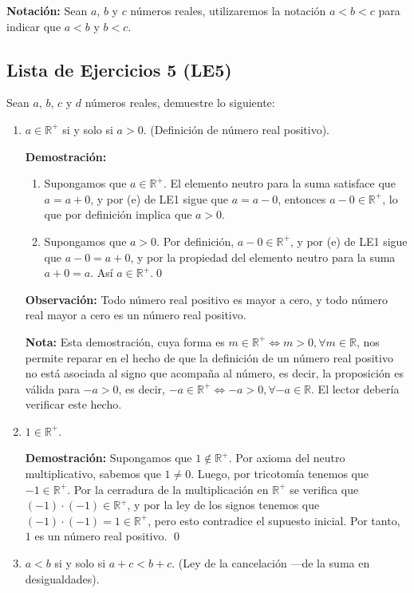\documentclass[11pt]{article}
\newcommand{\R}{\mathbb{R}}
\begin{document}
\textbf{Notación:} Sean $a$, $b$ y $c$ números reales, utilizaremos la notación $a<b<c$ para indicar que $a<b$ y $b<c$.

\subsection*{Lista de Ejercicios 5 (LE5)}

Sean $a$, $b$, $c$ y $d$ números reales, demuestre lo siguiente:
\begin{enumerate}[label=\alph*)]
    \item $a \in \R^+$ si y solo si $a>0$. (Definición de número real positivo).
    
    \textbf{Demostración:} \begin{enumerate}[label=\roman*)]
        \item Supongamos que $a \in \R^+$. El elemento neutro para la suma satisface que $a=a+0$, y por (e) de LE1 sigue que $a=a-0$, entonces $a-0 \in \R^+$, lo que por definición implica que $a>0$.
        \item Supongamos que $a>0$. Por definición, $a-0 \in \R^+$, y por (e) de LE1 sigue que $a-0=a+0$, y por la propiedad del elemento neutro para la suma $a+0=a$. Así $a \in \R^+$.\qed
    \end{enumerate}

    \textbf{Observación:} Todo número real positivo es mayor a cero, y todo número real mayor a cero es un número real positivo.
    
    \textbf{Nota:} Esta demostración, cuya forma es $m\in \R^+ \iff m>0, \forall m\in \R$, nos permite reparar en el hecho de que la definición de un número real positivo no está asociada al signo que acompaña al número, es decir, la proposición es válida para $-a>0$, es decir, $-a\in \R^+ \iff -a>0, \forall -a\in \R$. El lector debería verificar este hecho.

    \item $1 \in \R^+$.
    
    \textbf{Demostración:} Supongamos que $1 \notin \R^+$. Por axioma del neutro multiplicativo, sabemos que $1\neq 0$. Luego, por tricotomía tenemos que $-1 \in \R^+$. Por la cerradura de la multiplicación en $\R^+$ se verifica que $(-1) \cdot (-1) \in \R^+$, y por la ley de los signos tenemos que $(-1) \cdot (-1) = 1 \in \R^+$, pero esto contradice el supuesto inicial. Por tanto, $1$ es un número real positivo. \qed

    \item $a<b$ si y solo si $a+c<b+c$. (Ley de la cancelación —de la suma en desigualdades).
    

\end{enumerate}
\end{document}
